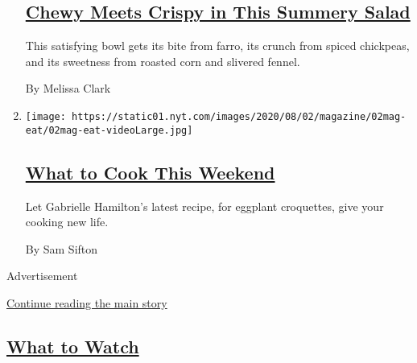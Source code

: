 \begin{enumerate}
  \hypertarget{chewy-meets-crispy-in-this-summery-salad}{%
  \subsection{\texorpdfstring{\href{/2020/07/31/dining/farro-corn-chickpea-salad-recipe.html}{Chewy
  Meets Crispy in This Summery
  Salad}}{Chewy Meets Crispy in This Summery Salad}}\label{chewy-meets-crispy-in-this-summery-salad}}

  This satisfying bowl gets its bite from farro, its crunch from spiced
  chickpeas, and its sweetness from roasted corn and slivered fennel.

  By Melissa Clark
\item
  \texttt{[image: https://static01.nyt.com/images/2020/08/02/magazine/02mag-eat/02mag-eat-videoLarge.jpg]}

  \hypertarget{what-to-cook-this-weekend}{%
  \subsection{\texorpdfstring{\href{/2020/07/31/dining/what-to-cook-this-weekend.html}{What
  to Cook This
  Weekend}}{What to Cook This Weekend}}\label{what-to-cook-this-weekend}}

  Let Gabrielle Hamilton's latest recipe, for eggplant croquettes, give
  your cooking new life.

  By Sam Sifton
\end{enumerate}

Advertisement

\protect\hyperlink{after-mid1}{Continue reading the main story}

\hypertarget{what-to-watch}{%
\subsection{\texorpdfstring{\protect\hyperlink{}{What to
Watch}}{What to Watch}}\label{what-to-watch}}

